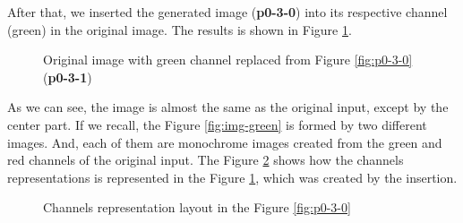 \documentclass[12pt,a4paper]{article}
\begin{document}
After that, we inserted the generated image (\textbf{p0-3-0}) into its respective channel (green) in the original image. The results is shown in Figure \ref{fig:p0-3-1}.

\begin{figure}[!h]
	\centering
	{%
		\setlength{\fboxsep}{1pt}%
		\setlength{\fboxrule}{1pt}%
	}%
	\caption{Original image with green channel replaced from Figure \ref{fig:p0-3-0} (\textbf{p0-3-1})}
	\label{fig:p0-3-1}
\end{figure}

As we can see, the image is almost the same as the original input, except by the center part. If we recall, the Figure \ref{fig:img-green} is formed by two different images. And, each of them are monochrome images created from the green and red channels of the original input. The Figure \ref{fig:channels} shows how the channels representations is represented in the Figure \ref{fig:p0-3-1}, which was created by the insertion. \\

\begin{figure}[!h]
	\centering
	{%
		\setlength{\fboxsep}{1pt}%
		\setlength{\fboxrule}{1pt}%
	}%
	\caption{Channels representation layout in the Figure \ref{fig:p0-3-0}}
	\label{fig:channels}
\end{figure}
\end{document}
